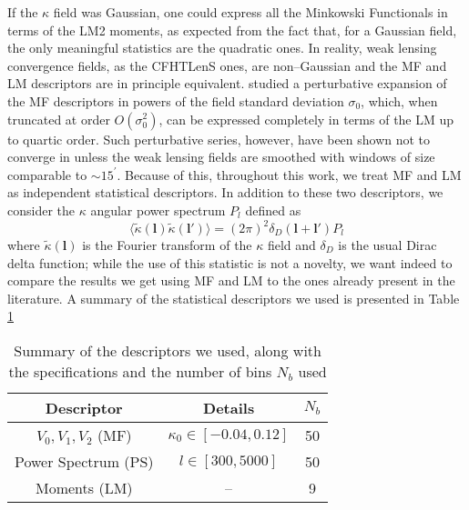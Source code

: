 \documentclass[reprint,aps,prd,superscriptaddress,showkeys,showpacs]{revtex4-1}
\begin{document}
%
If the $\kappa$ field was Gaussian, one could express all the Minkowski Functionals in terms of the LM2 moments, as expected from the fact that, for a Gaussian field, the only meaningful statistics are the quadratic ones. In reality, weak lensing convergence fields, as the CFHTLenS ones, are non--Gaussian and the MF and LM descriptors are in principle equivalent. \citep{Munshi12,Matsubara10} studied a perturbative expansion of the MF descriptors in powers of the field standard deviation $\sigma_0$, which, when truncated at order $O(\sigma_0^2)$, can be expressed completely in terms of the LM up to quartic order. Such perturbative series, however, have been shown not to converge in \citep{Petri2013} unless the weak lensing fields are smoothed with windows of size comparable to $\sim 15^\prime$. Because of this, throughout this work, we treat MF and LM as independent statistical descriptors. In addition to these two descriptors, we consider the $\kappa$ angular power spectrum $P_l$ defined as
\begin{equation}
\label{powerspectrum}
\langle\tilde{\kappa}(\mathbf{l})\tilde{\kappa}(\mathbf{l}')\rangle=(2\pi)^2\delta_D(\mathbf{l}+\mathbf{l}')P_l
\end{equation}  
%
where $\tilde{\kappa}(\mathbf{l})$ is the Fourier transform of the $\kappa$ field and $\delta_D$ is the usual Dirac delta function; while the use of this statistic is not a novelty, we want indeed to compare the results we get using MF and LM to the ones already present in the literature. A summary of the statistical descriptors we used is presented in Table \ref{desctable}
%
\begin{table}
\begin{tabular}{c|c|c} \hline
Descriptor & Details & $N_b$ \\ \hline
$V_0,V_1,V_2$ (MF) & $\kappa_0\in[-0.04,0.12]$ & 50 \\
Power Spectrum (PS) & $l \in [300,5000]$ & 50 \\
Moments (LM) & -- & 9 \\
\end{tabular}
\caption{Summary of the descriptors we used, along with the specifications and the number of bins $N_b$ used}
\label{desctable}
\end{table}
%
\end{document}
